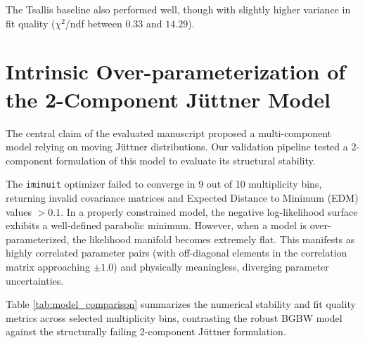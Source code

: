 The Tsallis baseline also performed well, though with slightly higher variance in fit quality ($\chi^2$/ndf between $0.33$ and $14.29$).

\section{Intrinsic Over-parameterization of the 2-Component J\"uttner Model}
The central claim of the evaluated manuscript proposed a multi-component model relying on moving J\"uttner distributions. Our validation pipeline tested a 2-component formulation of this model to evaluate its structural stability.

The \texttt{iminuit} optimizer failed to converge in 9 out of 10 multiplicity bins, returning invalid covariance matrices and Expected Distance to Minimum (EDM) values $> 0.1$. In a properly constrained model, the negative log-likelihood surface exhibits a well-defined parabolic minimum. However, when a model is over-parameterized, the likelihood manifold becomes extremely flat. This manifests as highly correlated parameter pairs (with off-diagonal elements in the correlation matrix approaching $\pm 1.0$) and physically meaningless, diverging parameter uncertainties.

Table \ref{tab:model_comparison} summarizes the numerical stability and fit quality metrics across selected multiplicity bins, contrasting the robust BGBW model against the structurally failing 2-component J\"uttner formulation.

\begin{table}[h]
\centering
\caption{Comparison of fit quality and structural stability metrics between the BGBW baseline and the 2-Component J\"uttner model.}
\label{tab:model_comparison}
\end{table}

